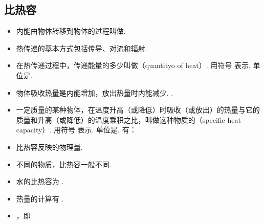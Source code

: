 \subsection{比热容}
\vspace{10pt}
\begin{itemize}
\item 内能由物体转移到物体的过程叫做.
\item 热传递的基本方式包括传导、对流和辐射.
\item 在热传递过程中，传递能量的多少叫做（quantityo of heat）. 用符号  表示. 单位是. 
\item 物体吸收热量是内能增加，放出热量时内能减少. .
\item 一定质量的某种物体，在温度升高（或降低）时吸收（或放出）的热量与它的质量和升高（或降低）的温度乘积之比，叫做这种物质的（specific heat capacity）. 用符号  表示. 单位是. 有：
\item 比热容反映的物理量.
\item 不同的物质，比热容一般不同.
\item 水的比热容为 .
\item 热量的计算有 .
\item {}，即 .
\end{itemize}